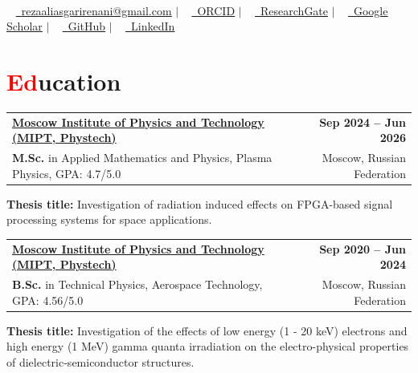 \documentclass[a4paper, 11pt]{article}
\makeatletter
\newcommand{\resumeItem}[1]{
    \item\small{
        {#1 \vspace{-2pt}}
    }
}
\newcommand{\resumeSubheading}[4]{
    \vspace{-2pt}\item
    \begin{tabular*}{1.0\textwidth}[t]{l@{\extracolsep{\fill}}r}
        \textbf{#1} & \textbf{\small #2} \\
        \small#3 & \small #4
    \end{tabular*}\vspace{-7pt}
}
\newcommand{\resumeSubHeadingListStart}{\begin{itemize}[leftmargin=0.0in, label={}]}
\newcommand{\resumeSubHeadingListEnd}{\end{itemize}}
\makeatother
\begin{document}
\begin{center}
    {\Huge \scshape {\fontsize{25}{30}\selectfont{Reza}} {\fontsize{25}{30}}} \\ 
    \vspace{5pt}
    \small ~ 
    \href{mailto:rezaaliasgarirenani@gmail.com}{\raisebox{-0.2\height}\faEnvelope\ \underline{rezaaliasgarirenani@gmail.com}} $|$ ~
    \href{https://orcid.org/0009-0000-8983-755X}{\raisebox{-0.2\height}\faOrcid\ \underline{ORCID}} $|$ ~
    \href{https://www.researchgate.net/profile/Reza-Aliasgari-Renani}{\raisebox{-0.2\height}\faResearchgate\
    \underline{ResearchGate}} $|$ ~
    \href{https://scholar.google.com/citations?user=L9Vv3C8AAAAJ&hl=en}{\raisebox{-0.2\height}\faGraduationCap\ \underline{Google Scholar}} $|$ ~
    \href{https://github.com/rezaaliasgarirenani}{\raisebox{-0.2\height}\faGithub\ \underline{GitHub}} $|$ ~
    \href{https://linkedin.com/in/reza-aliasgari-renani}{\raisebox{-0.2\height}\faLinkedin\ \underline{LinkedIn}}
    \vspace{-5pt}
\end{center}

\section{\textcolor{red}{Ed}ucation}
\resumeSubHeadingListStart
    \resumeSubheading
        {\href{https://mipt.ru/}{Moscow Institute of Physics and Technology (MIPT, Phystech)}}{Sep 2024 -- Jun 2026}
        {\textbf{M.Sc.} in Applied Mathematics and Physics, Plasma Physics, GPA: 4.7/5.0}{Moscow, Russian Federation}
        {\resumeItem{\textbf{Thesis title:} Investigation of radiation induced effects on FPGA-based signal processing systems for space applications.}}
    \resumeSubheading
        {\href{https://mipt.ru/}{Moscow Institute of Physics and Technology (MIPT, Phystech)}}{Sep 2020 -- Jun 2024}
        {\textbf{B.Sc.} in Technical Physics, Aerospace Technology, GPA: 4.56/5.0}{Moscow, Russian Federation}
        {\resumeItem{\textbf{Thesis title:} Investigation of the effects of low energy (1 - 20 keV) electrons and high energy (1 MeV) gamma quanta irradiation on the electro-physical properties of dielectric-semiconductor structures.}}
\resumeSubHeadingListEnd
\vspace{-15pt}

\end{document}
